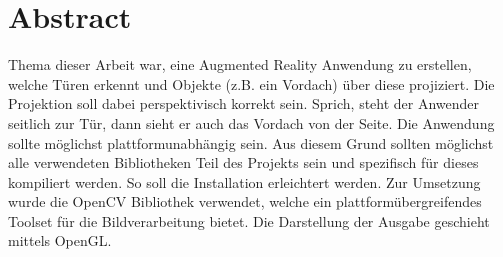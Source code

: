 \chapter*{Abstract}
Thema dieser Arbeit war, eine Augmented Reality Anwendung zu erstellen, welche Türen erkennt und Objekte (z.B. ein Vordach) über diese projiziert. Die Projektion soll dabei perspektivisch korrekt sein. Sprich, steht der Anwender seitlich zur Tür, dann sieht er auch das Vordach von der Seite. Die Anwendung sollte möglichst plattformunabhängig sein. Aus diesem Grund sollten möglichst alle verwendeten Bibliotheken Teil des Projekts sein und spezifisch für dieses kompiliert werden. So soll die Installation erleichtert werden. Zur Umsetzung wurde die OpenCV Bibliothek verwendet, welche ein plattformübergreifendes Toolset für die Bildverarbeitung bietet. Die Darstellung der Ausgabe geschieht mittels OpenGL.